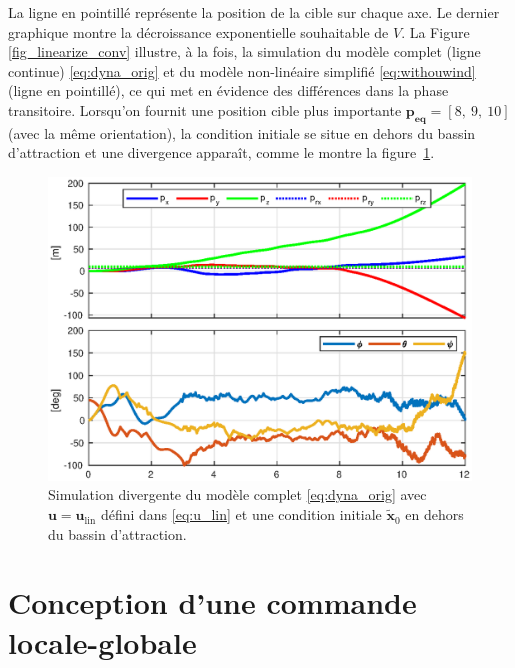  La ligne en pointillé représente la position de la cible sur chaque axe. Le dernier graphique montre la décroissance exponentielle souhaitable de $V$.
La Figure \ref{fig_linearize_conv} illustre, à la fois, la simulation du modèle complet (ligne continue) \eqref{eq:dyna_orig} et du modèle non-linéaire simplifié \eqref{eq:withouwind} (ligne en pointillé), ce qui met en évidence des différences dans la phase transitoire.
Lorsqu'on fournit une position cible plus importante $\boldsymbol{p_{\text{eq}}} =[8,~9,~10]$(avec la même orientation), la condition initiale se situe en dehors du bassin d'attraction et une divergence apparaît, comme le montre la figure~\ref{fig_linearize_div}.

\begin{figure}[ht!]
    \centering
    \includegraphics[trim=0cm 0cm 0cm 0cm,clip,width=0.8\columnwidth]{figures/diverge2.eps}
    \caption{Simulation divergente du modèle complet \eqref{eq:dyna_orig} avec $\boldsymbol{u} = \boldsymbol{u}_{\text{lin}}$ défini dans 
    \eqref{eq:u_lin} et une condition initiale $\tilde{ \boldsymbol{x}}_0$ en dehors du bassin d'attraction.}
    \label{fig_linearize_div}
\end{figure}



\section{Conception d'une commande locale-globale}
\label{sec:ctrl_hyste}
 
